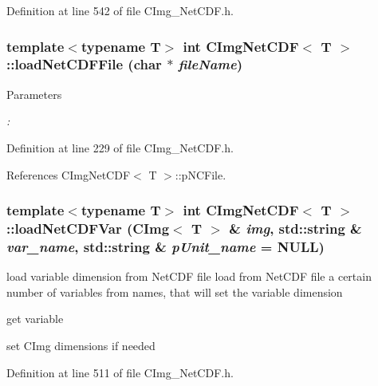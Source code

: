Definition at line 542 of file CImg\_\-NetCDF.h.\hypertarget{classCImgNetCDF_ae7d505dcbd88ede3b6a1c771ce8a6be7}{
\subsubsection[{loadNetCDFFile}]{\setlength{\rightskip}{0pt plus 5cm}template$<$typename T$>$ int {\bf CImgNetCDF}$<$ T $>$::loadNetCDFFile (char $\ast$ {\em fileName})}}
\label{classCImgNetCDF_ae7d505dcbd88ede3b6a1c771ce8a6be7}

\begin{DoxyParams}{Parameters}
\item[{\em :}]\end{DoxyParams}

\begin{DoxyCode}
\end{DoxyCode}
 

Definition at line 229 of file CImg\_\-NetCDF.h.

References CImgNetCDF$<$ T $>$::pNCFile.\hypertarget{classCImgNetCDF_a72dbe97219bf43d21637dc01dcc972f6}{
\subsubsection[{loadNetCDFVar}]{\setlength{\rightskip}{0pt plus 5cm}template$<$typename T$>$ int {\bf CImgNetCDF}$<$ T $>$::loadNetCDFVar (CImg$<$ T $>$ \& {\em img}, \/  std::string \& {\em var\_\-name}, \/  std::string \& {\em pUnit\_\-name} = {\ttfamily NULL})}}
\label{classCImgNetCDF_a72dbe97219bf43d21637dc01dcc972f6}


load variable dimension from NetCDF file load from NetCDF file a certain number of variables from names, that will set the variable dimension


\begin{DoxyCode}
\end{DoxyCode}
 

get variable

set CImg dimensions if needed 

Definition at line 511 of file CImg\_\-NetCDF.h.

